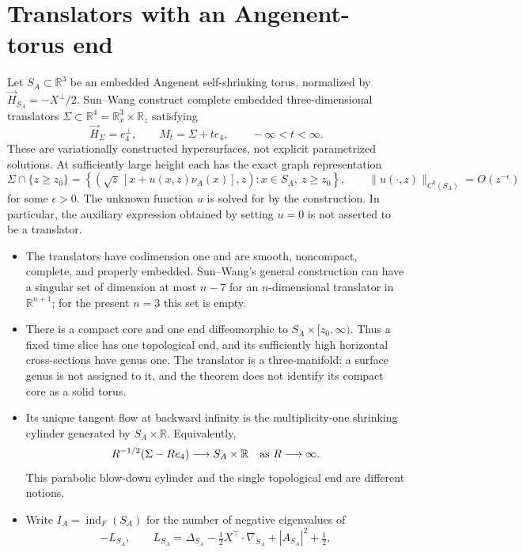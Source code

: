 \chapter{Translators with an Angenent-torus end}\label{sec:catalogue-sun-wang-torus-translators}
\begin{example}\label{ex:catalogue-sun-wang-torus-translators}
Let $S_A\subset\mathbb R^3$ be an embedded Angenent self-shrinking torus, normalized by $\vec H_{S_A}=-X^\perp/2$. Sun--Wang construct complete embedded three-dimensional translators $\Sigma\subset\mathbb R^4=\mathbb R^3_x\times\mathbb R_z$ satisfying
\[
 \vec H_\Sigma=e_4^\perp,\qquad M_t=\Sigma+t e_4,\qquad -\infty<t<\infty.
\]
These are variationally constructed hypersurfaces, not explicit parametrized solutions. At sufficiently large height each has the exact graph representation
\[
 \Sigma\cap\{z\geq z_0\}
 =\left\{\left(\sqrt z\,[x+u(x,z)\nu_A(x)],z\right):
 x\in S_A,\ z\geq z_0\right\},\qquad
 \|u(\cdot,z)\|_{C^0(S_A)}=O(z^{-\epsilon})
\]
for some $\epsilon>0$. The unknown function $u$ is solved for by the construction. In particular, the auxiliary expression obtained by setting $u=0$ is not asserted to be a translator.
\begin{itemize}
\item The translators have codimension one and are smooth, noncompact, complete, and properly embedded. Sun--Wang's general construction can have a singular set of dimension at most $n-7$ for an $n$-dimensional translator in $\mathbb R^{n+1}$; for the present $n=3$ this set is empty.
\item There is a compact core and one end diffeomorphic to $S_A\times[z_0,\infty)$. Thus a fixed time slice has one topological end, and its sufficiently high horizontal cross-sections have genus one. The translator is a three-manifold: a surface genus is not assigned to it, and the theorem does not identify its compact core as a solid torus.
\item Its unique tangent flow at backward infinity is the multiplicity-one shrinking cylinder generated by $S_A\times\mathbb R$. Equivalently,
\[
 R^{-1/2}(\Sigma-R e_4)\longrightarrow S_A\times\mathbb R
 \quad\hbox{as }R\longrightarrow\infty.
\]
This parabolic blow-down cylinder and the single topological end are different notions.
\item Write $I_A=\operatorname{ind}_{F}(S_A)$ for the number of negative eigenvalues of
\[
 -L_{S_A},\qquad
 L_{S_A}=\Delta_{S_A}-\tfrac12 X^\top\!\cdot\nabla_{S_A}
             +|A_{S_A}|^2+\tfrac12,
\]
\end{itemize}
\end{example}
